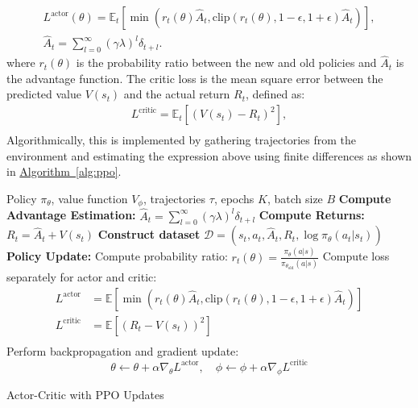 \begin{gather*}
    L^{\text{actor}}(\theta) = \mathbb{E}_t \left[ \min \left( r_t(\theta) \hat{A}_t, \text{clip}(r_t(\theta), 1 - \epsilon, 1 + \epsilon) \hat{A}_t \right) \right],\\
    \hat{A}_t = \sum_{l=0}^{\infty} (\gamma \lambda)^l \delta_{t+l}.
\end{gather*}
where \( r_t(\theta) \) is the probability ratio between the new and old policies and $\hat{A}_t$ is the advantage function.
The critic loss is the mean square error between the predicted value $V(s_t)$ and the actual return $R_t$, defined as:
\begin{gather*}
    L^{\text{critic}} = \mathbb{E}_t \left[ \left( V(s_t) - R_t \right)^2 \right],\\
\end{gather*}
Algorithmically, this is implemented by gathering trajectories from the environment and estimating the expression above using finite differences
as shown in \hyperref[alg:ppo]{Algorithm~\ref{alg:ppo}}.
\begin{algorithm}
    \begin{algorithmic}[1]
        \Require Policy $\pi_\theta$, value function $V_\phi$, trajectories $\tau$, epochs $K$, batch size $B$
        \State \textbf{Compute Advantage Estimation:}
        \State $\hat{A}_t = \sum_{l=0}^{\infty} (\gamma \lambda)^l \delta_{t+l}$
        \State \textbf{Compute Returns:} $R_t = \hat{A}_t + V(s_t)$
        \State \textbf{Construct dataset} $\mathcal{D} = (s_t, a_t, \hat{A}_t, R_t, \log \pi_\theta(a_t | s_t))$
                \State \textbf{Policy Update:}
                \State Compute probability ratio:
                \(
                r_t(\theta) = \frac{\pi_\theta(a | s)}{\pi_{\theta_{\text{old}}}(a | s)}
                \)
                \State Compute loss separately for actor and critic:
                \begin{equation*}
                    \begin{aligned}
                        L^{\text{actor}} &= \mathbb{E} \left[ \min(r_t(\theta) \hat{A}_t, \text{clip}(r_t(\theta), 1 - \epsilon, 1 + \epsilon) \hat{A}_t) \right]\\
                        L^{\text{critic}} &= \mathbb{E} \left[ (R_t - V(s_t))^2 \right]\\
                    \end{aligned}
                \end{equation*}
                \State Perform backpropagation and gradient update:
                \[
                    \theta \gets \theta + \alpha \nabla_\theta L^{\text{actor}}, \quad \phi \gets \phi + \alpha \nabla_\phi L^{\text{critic}}
                \]
            \EndFor
        \EndFor
    \end{algorithmic}
    \caption{Actor-Critic with PPO Updates}
    \label{alg:ppo}
\end{algorithm}
